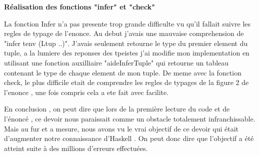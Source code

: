 \documentclass{article}
\begin{document}
\textbf {Réalisation des fonctions "infer" et "check"} \vspace{.7 cm}

La fonction Infer n'a pas presente trop grande difficulte vu qu'il fallait suivre les regles de typage de l'enonce. Au debut j'avais une mauvaise comprehension de "infer tenv (Ltup ..)". J'avais seulement retourne le type du premier element du tuple, a la lumiere des reponses des tpeistes j'ai modifie mon implementation en utilisant une fonction auxilliaire "aideInferTuple" qui retourne un tableau contenant le type de chaque element de mon tuple.  
De meme avec la fonction check, le plus difficile etait de comprendre les regles de typages de la figure 2 de l'enonce , une fois compris cela a ete fait avec facilite.\vspace{.7 cm}


En conclusion , on peut dire que lors de la première lecture du code et de l'énoncé , ce devoir nous paraissait comme un obstacle totalement infranchissable. Mais au fur et a mesure, nous avons vu le vrai objectif de ce devoir qui était d'augmenter notre connaissance d'Haskell . On peut donc dire que  l'objectif a été atteint suite à des millions d'erreurs effectuées.
\end{document}
